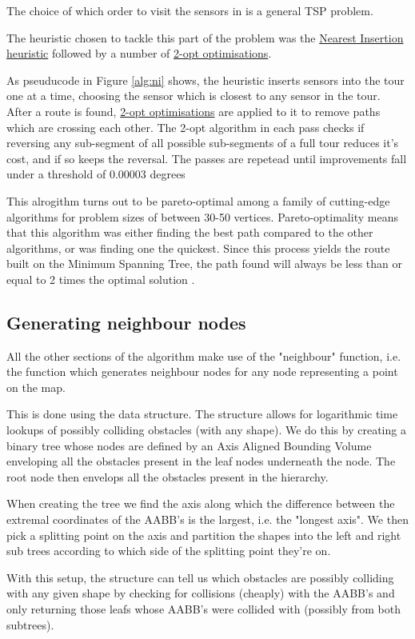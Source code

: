 \documentclass[10pt,a4paper]{article}
\begin{document}
The choice of which order to visit the sensors in is a general TSP problem.
\par 
The heuristic chosen to tackle this part of the problem was the \hyperref[tab:NearestInsertionCollectionOrderPlanner]{\color{blue}Nearest Insertion heuristic} followed by a number of \hyperref[tab:Optimiser2Opt]{\color{blue}2-opt optimisations}.
\par
As pseuducode in Figure \ref{alg:ni} shows, the heuristic inserts sensors into the tour one at a time, choosing the sensor which is closest to any sensor in the tour.
\\
After a route is found, \hyperref[tab:Optimiser2Opt]{\color{blue}2-opt optimisations} are applied to it to remove paths which are crossing each other.
The 2-opt algorithm in each pass checks if reversing any sub-segment of all possible sub-segments of a full tour reduces it's cost, and if so keeps the reversal. 
The passes are repetead until improvements fall under a threshold of 0.00003 degrees

This alrogithm turns out to be pareto-optimal \cite{metric-tsp} among a family of cutting-edge algorithms for problem sizes of between 30-50 vertices.
Pareto-optimality means that this algorithm was either finding the best path compared to the other algorithms, or was finding one the quickest. 
Since this process yields the route built on the Minimum Spanning Tree, 
the path found will always be less than or equal to 2 times the optimal solution \cite{2-approximation-ni}.
\subsection{Generating neighbour nodes}
All the other sections of the algorithm make use of the "neighbour" function, i.e. the function which generates neighbour nodes for any node representing 
a point on the map.

This is done using the \hyperref[tab:BVHNode]{\color{blue}{Bounding Volume Hierarchy}} data structure. 
The structure allows for logarithmic time lookups of possibly colliding obstacles (with any shape).
We do this by creating a binary tree whose nodes are defined by an Axis Aligned Bounding Volume enveloping all the obstacles present in the leaf nodes underneath the node.
The root node then envelops all the obstacles present in the hierarchy.
\par
When creating the tree we find the axis along which the difference between the extremal coordinates of the AABB's is the largest, i.e. the "longest axis".
We then pick a splitting point on the axis and partition the shapes into the left and right sub trees according to which side of the splitting point they're on.
\par 
With this setup, the structure can tell us which obstacles are possibly colliding with any given shape by checking for collisions (cheaply) with the AABB's and only returning those leafs whose AABB's were collided with (possibly from both subtrees).
\end{document}
